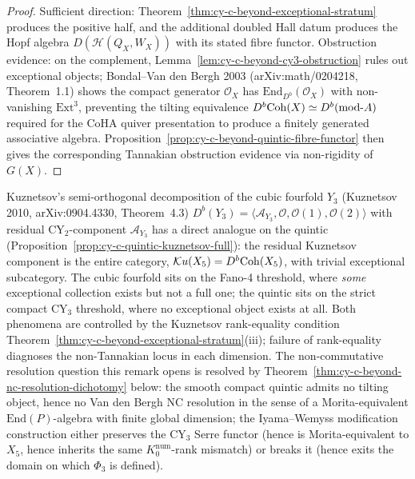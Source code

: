 \begin{proof}
Sufficient direction: Theorem~\ref{thm:cy-c-beyond-exceptional-stratum}
produces the positive half, and the additional doubled Hall datum
produces the Hopf algebra \(D(\mathcal H(Q_X,W_X))\) with its stated
fibre functor. Obstruction
evidence: on the complement, Lemma~\ref{lem:cy-c-beyond-cy3-obstruction}
rules out exceptional objects; Bondal--Van den Bergh 2003
(arXiv:math/0204218, Theorem~1.1) shows the compact generator
$\mathcal O_X$ has $\mathrm{End}_{D^b}(\mathcal O_X)$ with non-vanishing
$\mathrm{Ext}^3$, preventing the tilting equivalence
$D^b\mathrm{Coh}(X) \simeq D^b(\mathrm{mod}\text{-}A)$ required for the CoHA
quiver presentation to produce a finitely generated associative algebra.
Proposition~\ref{prop:cy-c-beyond-quintic-fibre-functor} then gives the
corresponding Tannakian obstruction evidence via non-rigidity of $G(X)$.
\end{proof}

\begin{remark}
\label{rem:cy-c-beyond-kuznetsov-residual}
Kuznetsov's semi-orthogonal decomposition of the cubic fourfold $Y_3$
(Kuznetsov 2010, arXiv:0904.4330, Theorem~4.3)
$D^b(Y_3) = \langle \mathcal A_{Y_3}, \mathcal O, \mathcal O(1),
\mathcal O(2) \rangle$ with residual CY$_2$-component $\mathcal A_{Y_3}$
has a direct analogue on the quintic
(Proposition~\ref{prop:cy-c-quintic-kuznetsov-full}): the residual
Kuznetsov component is the entire category,
$\mathcal{K}u(X_5) = D^b\mathrm{Coh}(X_5)$, with trivial exceptional
subcategory. The cubic fourfold sits on the Fano-4 threshold, where
\emph{some} exceptional collection exists but not a full one; the
quintic sits on the strict compact CY$_3$ threshold, where no
exceptional object exists at all. Both phenomena are controlled by the
Kuznetsov rank-equality condition
Theorem~\ref{thm:cy-c-beyond-exceptional-stratum}(iii); failure of
rank-equality diagnoses the non-Tannakian locus in each dimension. The
non-commutative resolution question this remark opens is resolved by
Theorem~\ref{thm:cy-c-beyond-nc-resolution-dichotomy} below: the smooth
compact quintic admits no tilting object, hence no Van den Bergh NC
resolution in the sense of a Morita-equivalent $\mathrm{End}(P)$-algebra
with finite global dimension; the Iyama--Wemyss modification construction
either preserves the CY$_3$ Serre functor (hence is Morita-equivalent to
$X_5$, hence inherits the same $K_0^{\mathrm{num}}$-rank mismatch) or
breaks it (hence exits the domain on which $\Phi_3$ is defined).
\end{remark}

